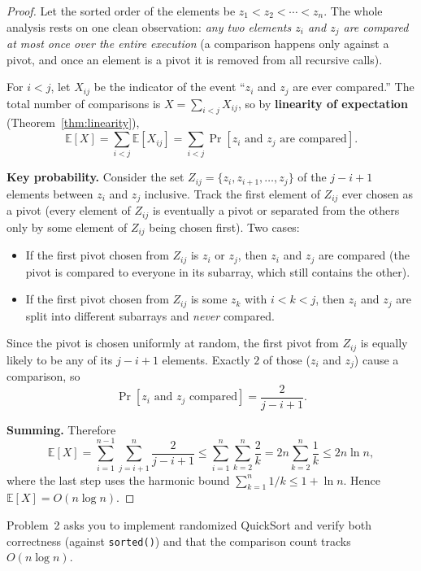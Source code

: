 \documentclass[11pt]{article}
\begin{document}
\begin{proof}
Let the sorted order of the elements be $z_1 < z_2 < \cdots < z_n$. The whole
analysis rests on one clean observation: \emph{any two elements $z_i$ and $z_j$ are
compared at most once over the entire execution} (a comparison happens only against
a pivot, and once an element is a pivot it is removed from all recursive calls).

For $i < j$, let $X_{ij}$ be the indicator of the event ``$z_i$ and $z_j$ are ever
compared.'' The total number of comparisons is $X = \sum_{i<j} X_{ij}$, so by
\textbf{linearity of expectation} (Theorem~\ref{thm:linearity}),
\[
    \mathbb{E}[X] = \sum_{i<j} \mathbb{E}[X_{ij}] = \sum_{i<j} \Pr[z_i \text{ and } z_j \text{ are compared}].
\]

\textbf{Key probability.} Consider the set $Z_{ij} = \{z_i, z_{i+1}, \ldots, z_j\}$
of the $j - i + 1$ elements between $z_i$ and $z_j$ inclusive. Track the first
element of $Z_{ij}$ ever chosen as a pivot (every element of $Z_{ij}$ is eventually
a pivot or separated from the others only by some element of $Z_{ij}$ being chosen
first). Two cases:
\begin{itemize}
    \item If the first pivot chosen from $Z_{ij}$ is $z_i$ or $z_j$, then $z_i$ and
    $z_j$ are compared (the pivot is compared to everyone in its subarray, which
    still contains the other).
    \item If the first pivot chosen from $Z_{ij}$ is some $z_k$ with $i < k < j$,
    then $z_i$ and $z_j$ are split into different subarrays and \emph{never}
    compared.
\end{itemize}
Since the pivot is chosen uniformly at random, the first pivot from $Z_{ij}$ is
equally likely to be any of its $j - i + 1$ elements. Exactly $2$ of those
($z_i$ and $z_j$) cause a comparison, so
\[
    \Pr[z_i \text{ and } z_j \text{ compared}] = \frac{2}{j - i + 1}.
\]

\textbf{Summing.} Therefore
\[
    \mathbb{E}[X] = \sum_{i=1}^{n-1}\sum_{j=i+1}^{n} \frac{2}{j-i+1}
    \le \sum_{i=1}^{n} \sum_{k=2}^{n} \frac{2}{k}
    = 2n \sum_{k=2}^{n} \frac1k
    \le 2n \ln n,
\]
where the last step uses the harmonic bound $\sum_{k=1}^{n} 1/k \le 1 + \ln n$.
Hence $\mathbb{E}[X] = O(n \log n)$.
\end{proof}

Problem~2 asks you to implement randomized QuickSort and verify both correctness
(against \texttt{sorted()}) and that the comparison count tracks $O(n \log n)$.
\end{document}
